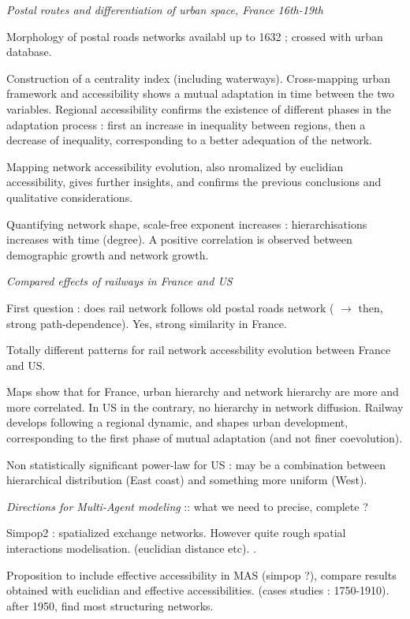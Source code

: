 \textit{Postal routes and differentiation of urban space, France 16th-19th}

Morphology of postal roads networks availabl up to 1632 ; crossed with urban database.

Construction of a centrality index (including waterways). Cross-mapping urban framework and accessibility shows a mutual adaptation in time between the two variables. Regional accessibility confirms the existence of different phases in the adaptation process : first an increase in inequality between regions, then a decrease of inequality, corresponding to a better adequation of the network.

Mapping network accessibility evolution, also nromalized by euclidian accessibility, gives further insights, and confirms the previous conclusions and qualitative considerations.

Quantifying network shape, scale-free exponent increases : hierarchisations increases with time (degree). A positive correlation is observed between demographic growth and network growth.

\textit{Compared effects of railways in France and US}

First question : does rail network follows old postal roads network ( $\rightarrow$ then, strong path-dependence). Yes, strong similarity in France.

Totally different patterns for rail network accessbility evolution between France and US.

Maps show that for France, urban hierarchy and network hierarchy are more and more correlated. In US in the contrary, no hierarchy in network diffusion. Railway develops following a regional dynamic, and shapes urban development, corresponding to the first phase of mutual adaptation (and not finer coevolution).

Non statistically significant power-law for US : may be a combination between hierarchical distribution (East coast) and something more uniform (West).



\textit{Directions for Multi-Agent modeling} :: what we need to precise, complete ?

Simpop2 : spatialized exchange networks. However quite rough spatial interactions modelisation. (euclidian distance etc). \cite{bretagnolle:halshs-00159894}.

Proposition to include effective accessibility in MAS (simpop ?), compare results obtained with euclidian and effective accessibilities. (cases studies : 1750-1910). after 1950, find most structuring networks.





